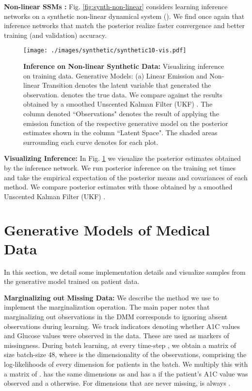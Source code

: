 \documentclass[letterpaper]{article}
\theoremstyle{plain}
\newcommand{\citep}{\cite}
\newcommand{\DMM}{DMM\xspace}
\begin{document}
{\textbf{Non-linear SSMs :} Fig. \ref{fig:synth-non-linear} considers learning inference networks on a synthetic 
non-linear dynamical system (). 
We find once again that inference networks that match the posterior realize
faster convergence and better training (and validation) accuracy. 
 
\begin{figure}[h!]
	\texttt{[image: ./images/synthetic/synthetic10-vis.pdf]}
	\caption{\textbf{Inference on Non-linear Synthetic Data: } Visualizing inference on training data. Generative Models: (a) Linear Emission and Non-linear Transition 
	 denotes the latent variable that generated the observation.  denotes the true data. We compare against the results obtained by a smoothed Unscented Kalman Filter (UKF) \citep{wan2000unscented}. 
	The column denoted ``Observations" denotes the result of applying the
emission function of the respective generative model on the posterior estimates shown in the column ``Latent Space".
The shaded areas surrounding each curve  denotes  for each plot.
}
\label{fig:synth-reconstructions}
\end{figure} 

\textbf{Visualizing Inference: } In Fig. \ref{fig:synth-reconstructions} 
we visualize the posterior
estimates obtained by the inference network. 
We run posterior inference on the training set  times and take the empirical
expectation of the posterior means and covariances of each method. 
We compare posterior estimates with those obtained by a smoothed 
Unscented Kalman Filter (UKF) \cite{wan2000unscented}. 
 \section{Generative Models of Medical Data}

In this section, we detail some implementation details and visualize samples from the generative model trained on patient data. 

\textbf{Marginalizing out Missing Data: } We describe the method we use 
to implement the marginalization operation. The main paper notes that 
marginalizing out observations in the \DMM corresponds to ignoring absent observations during learning. 
We track indicators denoting whether A1C values and Glucose values were observed in the data. These are 
used as markers of missingness. During batch learning, at every time-step , we obtain a matrix  of size batch-size  48, where  is the dimensionality of the observations,
comprising the log-likelihoods of every dimension for patients in the batch. We multiply this with a matrix of .  has the same dimensions as 
and has a  if the patient's A1C value was observed and a  otherwise. For dimensions that are never missing,  is always . 

}
\end{document}
